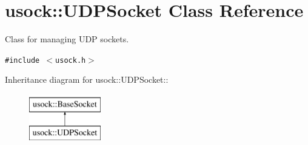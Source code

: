 \hypertarget{classusock_1_1UDPSocket}{
\section{usock::UDPSocket Class Reference}
\label{classusock_1_1UDPSocket}
}
Class for managing UDP sockets.  


{\tt \#include $<$usock.h$>$}

Inheritance diagram for usock::UDPSocket::\begin{figure}[H]
\begin{center}
\leavevmode
\includegraphics[height=2cm]{classusock_1_1UDPSocket}
\end{center}
\end{figure}
